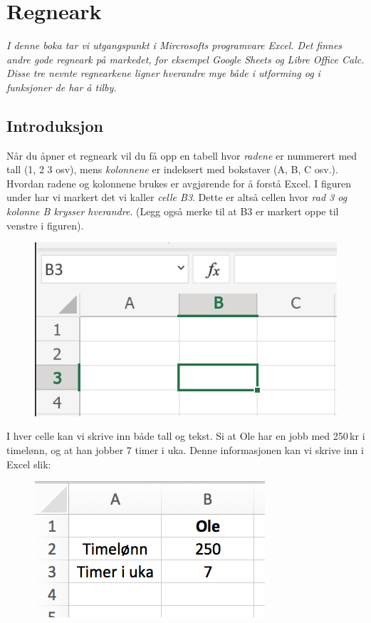 



\section{Regneark}

\textit{I denne boka tar vi utgangspunkt i Mircrosofts programvare Excel. Det finnes andre gode regneark på markedet, for eksempel Google Sheets og Libre Office Calc. Disse tre nevnte regnearkene ligner hverandre mye både i utforming og i funksjoner de har å tilby.
} 

\subsection{Introduksjon}

Når du åpner et regneark vil du få opp en tabell hvor \textit{radene} er nummerert med tall (1, 2 3 osv), mens \textit{kolonnene} er indeksert med bokstaver (A, B, C osv.). Hvordan radene og kolonnene brukes er avgjørende for å forstå Excel. I figuren under har vi markert det vi kaller \textit{celle B\textsl{3}}. Dette er altså cellen hvor \textsl{rad 3 og kolonne B krysser hverandre}. (Legg også merke til at B3 er markert oppe til venstre i figuren).

\begin{figure}[H]
	\centering
	\includegraphics[scale=0.25]{figs/B3}
\end{figure}
I hver celle kan vi skrive inn både tall og tekst. Si at Ole har en jobb med 250\,kr i timelønn, og at han jobber 7 timer i uka. Denne informasjonen kan vi skrive inn i Excel slik:
\begin{figure}[H]
	\centering
	\includegraphics[scale=0.35]{figs/ex2}
\end{figure}
